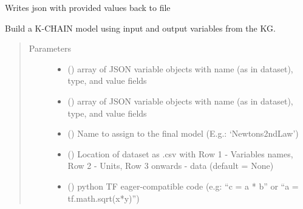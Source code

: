 \documentclass[letterpaper,10pt,english]{sphinxmanual}
\begin{document}
\begin{fulllineitems}
\begin{fulllineitems}
\end{fulllineitems}


\begin{fulllineitems}
\label{\detokenize{index:kChain.kChainModel._setDefaultValues}}
Writes json with provided values back to file

\end{fulllineitems}


\begin{fulllineitems}
\label{\detokenize{index:kChain.kChainModel.build}}
Build a K-CHAIN model using input and output variables from the KG.
\begin{quote}\begin{description}
\item[{Parameters}] \leavevmode\begin{itemize}
\item {} 
 () \textendash{} array of JSON variable objects with name (as in dataset), type, and value fields

\item {} 
 () \textendash{} array of JSON variable objects with name (as in dataset), type, and value fields

\item {} 
 () \textendash{} Name to assign to the final model (E.g.: ‘Newtons2ndLaw’)

\item {} 
 () \textendash{} Location of dataset as .csv with Row 1 - Variables names,
Row 2 - Units, Row 3 onwards - data (default = None)

\item {} 
 () \textendash{} python TF eager-compatible code (e.g: “c = a * b” or “a = tf.math.sqrt(x*y)”)


\end{itemize}
\end{description}
\end{quote}
\end{fulllineitems}
\end{fulllineitems}
\end{document}
